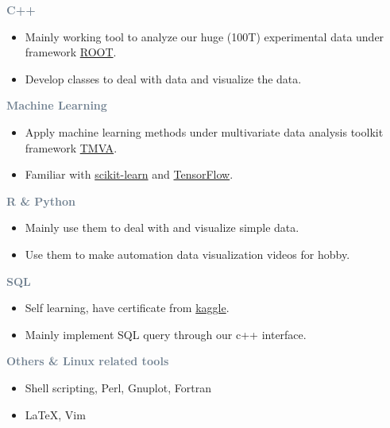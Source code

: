 
\textcolor{SlateGrey}{\textbf{C++}}
\newline

\begin{itemize}
    \item Mainly working tool to analyze our huge (100T) experimental data under framework \href{https://root.cern/}{ROOT}.
    \item Develop classes to deal with data and visualize the data.
\end{itemize}

\textcolor{SlateGrey}{\textbf{Machine Learning}}
\newline
\begin{itemize}
    \item Apply machine learning methods under multivariate data analysis toolkit framework \href{https://root.cern/manual/tmva/}{TMVA}.
    \item Familiar with \href{https://scikit-learn.org/stable/}{scikit-learn} and \href{https://www.tensorflow.org/}{TensorFlow}.
\end{itemize}
      
\textcolor{SlateGrey}{\textbf{R \& Python}}
\newline

\begin{itemize}
    \item Mainly use them to deal with and visualize simple data.
    \item Use them to make automation data visualization videos for hobby. 
\end{itemize}

\textcolor{SlateGrey}{\textbf{SQL}}
\newline

\begin{itemize}
    \item Self learning, have certificate from \href{https://www.kaggle.com/learn/overview}{kaggle}.
    \item Mainly implement SQL query through our c++ interface.
\end{itemize}

\textcolor{SlateGrey}{\textbf{Others \& Linux related tools}}
\newline

\begin{itemize}
    \item Shell scripting, Perl, Gnuplot, Fortran 
    \item \LaTeX, Vim
\end{itemize}

